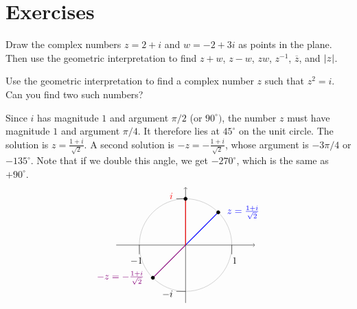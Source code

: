 \section*{Exercises}

\begin{ex}
  Draw the complex numbers $z = 2+i$ and $w = -2+3i$ as points in the
  plane. Then use the geometric interpretation to find $z+w$,
  $z-w$, $zw$, $z^{-1}$, $\overline{z}$, and $\left|z\right|$.
\end{ex}

\begin{ex}
  Use the geometric interpretation to find a complex number $z$ such
  that $z^2 = i$. Can you find two such numbers?
  \begin{sol}
    Since $i$ has magnitude $1$ and argument $\pi/2$ (or
    $90^{\circ})$, the number $z$ must have magnitude $1$ and argument
    $\pi/4$. It therefore lies at $45^{\circ}$ on the unit circle. The
    solution is $z=\frac{1+i}{\sqrt{2}}$. A second solution is
    $-z=-\frac{1+i}{\sqrt{2}}$, whose argument is $-3\pi/4$ or
    $-135^{\circ}$. Note that if we double this angle, we get
    $-270^{\circ}$, which is the same as $+90^{\circ}$.
    \begin{equation*}
      \begin{tikzpicture}[scale=1.7]
        \draw[black!30] (0,0) circle (1);
        \draw[->](-1.5,0) -- (1.5,0);
        \draw[->](0,-1.25) -- (0,1.25);
        \draw(0,-1) -- +(-0.2,0) node[left,yshift=-3pt] {$-i$};
        \draw(0,1) -- +(-0.2,0) node[left,yshift=3pt,red] {$i$};
        \draw(-1,0) -- +(0,-0.2) node[below,xshift=-3pt] {$-1$};
        \draw(1,0) -- +(0,-0.2) node[below,xshift=3pt] {$1$};
        \draw[thick, blue] (0,0) -- (45:1);
        \draw[thick, purple!70!blue] (0,0) -- (225:1);
        \draw[thick, red] (0,0) -- (90:1);
        \draw[fill, black] (45:1) circle [radius=1.06pt] node [right=2mm, blue] {$z = \frac{1+i}{\sqrt{2}}$};
        \draw[fill, black] (225:1) circle [radius=1.06pt] node [left=2mm, purple!70!blue] {$-z = -\frac{1+i}{\sqrt{2}}$};
        \draw[fill, black] (90:1) circle [radius=1.06pt];
      \end{tikzpicture}
    \end{equation*}
  \end{sol}
\end{ex}

